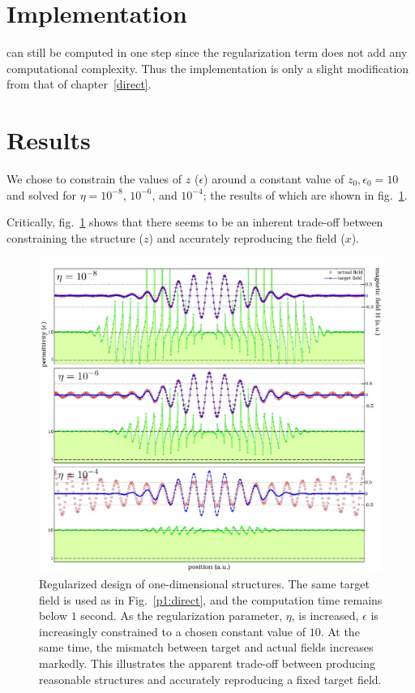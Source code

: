 \section{Implementation}
 can still be computed in one step
    since the regularization term does not add any computational complexity.
Thus the implementation is only a slight modification
    from that of chapter~\ref{direct}.

\section{Results}
We chose to constrain the values of $z$ ($\epsilon$) 
    around a constant value of $z_0, \epsilon_0 = 10$ and 
    solved  for $\eta=10^{-8}$, $10^{-6}$, and $10^{-4}$;
    the results of which are shown in fig.~\ref{regls pic}\cite{Lu10}.
    
Critically, fig.~\ref{regls pic} shows that there seems
    to be an inherent trade-off between 
        constraining the structure ($z$) 
        and accurately reproducing the field ($x$).

\begin{figure}[htbp]\centering
\includegraphics[width=\textwidth]{p1/regularized}
\caption{Regularized design of one-dimensional structures. 
    The same target field is used as in Fig.~\ref{p1:direct}, 
        and the computation time remains below $1$ second. 
    As the regularization parameter, $\eta$, is increased, 
        $\epsilon$ is increasingly constrained to 
        a chosen constant value of $10$. 
    At the same time, the mismatch between target and actual fields 
        increases markedly. 
    This illustrates the apparent trade-off between 
        producing reasonable structures and 
        accurately reproducing a fixed target field.}
\label{regls pic}
\end{figure}




